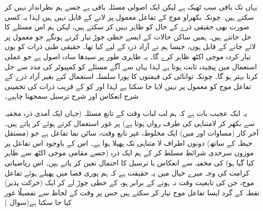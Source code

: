   یہاں تک باقی سب ٹھیک ہے لیکن ایک اصولی مسئلہ باقی  ہے جسے ہم نظرانداز نہیں کر سکتے ہیں.  چونکہ بکھراو   موج کے  تفاعل معمول پر لانے کے قابل نہیں ہیں لہٰذا یہ کسی صورت بھی حقیقی  ذرے کے حال کو ظاہر نہیں کر سکتے ہیں، لیکن ہم اس مسئلے کا حل جانتے ہیں۔ ہمیں ساکن حالات کے ایسے خطی جوڑ تیار کرنے ہونگے جو معمول پر لائے جانے کے قابل ہوں، جیسا ہم نے آزاد ذرہ  کے لیے کیا تھا۔   حقیقی طبی ذرات کو یوں تیار کردہ موجی اکٹھ  ظاہر کرے گا۔   یہ ظاہری طور پر سیدھا سادہ اصول ہے جو  عملی استعمال میں پیچیدہ ثابت ہوتا ہے لہٰذا یہاں سے آگے مسئلے کو کمپیوٹر کی مدد سے حل کرنا بہتر ہو گا۔  چونکہ  توانائی کی قیمتوں کا پورا سلسلہ استعمال کیے بغیر آزاد   ذرے کے تفاعل موج کو معمول پر نہیں لایا جا سکتا ہے لہٰذا    اور     کو  کے قریب ذرات کی تخمینی شرح  انعکاس   اور شرح ترسیل سمجھنا چاہیے۔ 
  
   یہ ایک عجیب بات ہے کہ ہم لب لباب وقت کے تابع مسئلہ (جہاں ایک آمدی ذرہ مخفیہ سے  بکھر کر لامتناہی کی طرف رواں ہوتا ہے)  پر غور     استعمال کرتے ہوئے کر پاتے  ہیں۔  آخر کار  (مساوات   اور  میں) ایک مخلوط، غیر تابع وقت، سائن   نما تفاعل ہے جو (مستقل  حیطہ  کے ساتھ)  دونوں اطراف لا متناہی تک  پھیلا ہوا ہے۔ اس کے باوجود اس تفاعل پر موزوں سرحدی شرائط مسلط کر کے ہم  ایک ذرہ    (جسے مقامی موجی اکٹھ  سے ظاہر کیا گیا ہو)  کی مخفیہ سے انعکاس یا ترسیل کا احتمال تعین کر پاتے ہیں۔ اس ریاضیاتی کرامت کی وجہ میرے خیال میں یہ حقیقت ہے  کہ  ہم پوری  فضا میں پھیلے ہوئے تفاعل موج، جن کی تابعیت  وقت   نہ ہونے کے برابر ہو، کے خطی جوڑ لے کر ایک (حرکت پذیر)  نقطہ کے گرد ایسا تفاعل موج تیار کر سکتے ہیں جس پر  وقت کے لحاظ سے تفصیلًا غور کیا جا سکتا ہے(سوال )
  
